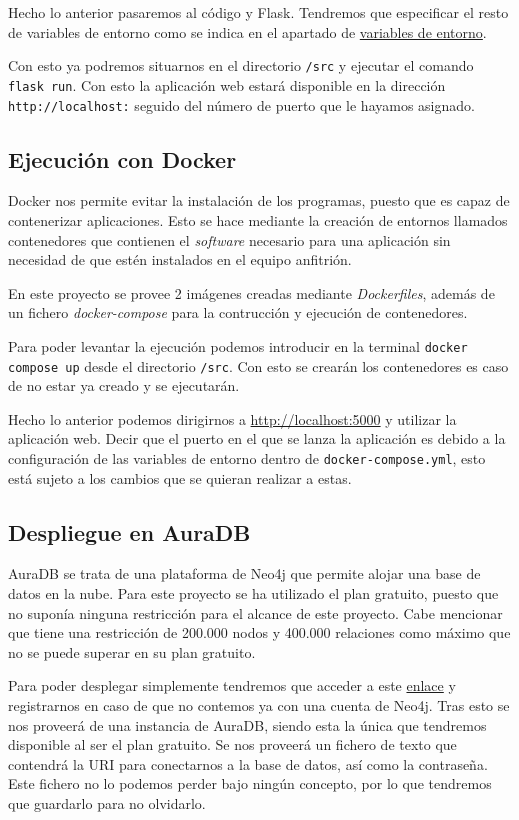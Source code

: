 Hecho lo anterior pasaremos al código y Flask. Tendremos que especificar el resto de variables de entorno como se indica en el apartado de \hyperref[sec:venv]{variables de entorno}.

Con esto ya podremos situarnos en el directorio \texttt{/src} y ejecutar el comando \texttt{flask run}. Con esto la aplicación web estará disponible en la dirección \texttt{http://localhost:} seguido del número de puerto que le hayamos asignado.
\subsection{Ejecución con Docker}
Docker nos permite evitar la instalación de los programas, puesto que es capaz de contenerizar aplicaciones. Esto se hace mediante la creación de entornos llamados contenedores que contienen el \textit{software} necesario para una aplicación sin necesidad de que estén instalados en el equipo anfitrión.

En este proyecto se provee 2 imágenes creadas mediante \textit{Dockerfiles}, además de un fichero \textit{docker-compose} para la contrucción y ejecución de contenedores.

Para poder levantar la ejecución podemos introducir en la terminal \texttt{docker compose up} desde el directorio \texttt{/src}. Con esto se crearán los contenedores es caso de no estar ya creado y se ejecutarán.

Hecho lo anterior podemos dirigirnos a \url{http://localhost:5000} y utilizar la aplicación web. Decir que el puerto en el que se lanza la aplicación es debido a la configuración de las variables de entorno dentro de \texttt{docker-compose.yml}, esto está sujeto a los cambios que se quieran realizar a estas.


\subsection{Despliegue en AuraDB}

AuraDB se trata de una plataforma de Neo4j que permite alojar una base de datos en la nube. Para este proyecto se ha utilizado el plan gratuito, puesto que no suponía ninguna restricción para el alcance de este proyecto. Cabe mencionar que tiene una restricción de 200.000 nodos y 400.000 relaciones como máximo que no se puede superar en su plan gratuito.

Para poder desplegar simplemente tendremos que acceder a este \href{https://neo4j.com/cloud/platform/aura-graph-database/?ref=neo4j-home-hero}{enlace} y registrarnos en caso de que no contemos ya con una cuenta de Neo4j. Tras esto se nos proveerá de una instancia de AuraDB, siendo esta la única que tendremos disponible al ser el plan gratuito. Se nos proveerá un fichero de texto que contendrá la URI para conectarnos a la base de datos, así como la contraseña. Este fichero no lo podemos perder bajo ningún concepto, por lo que tendremos que guardarlo para no olvidarlo.

